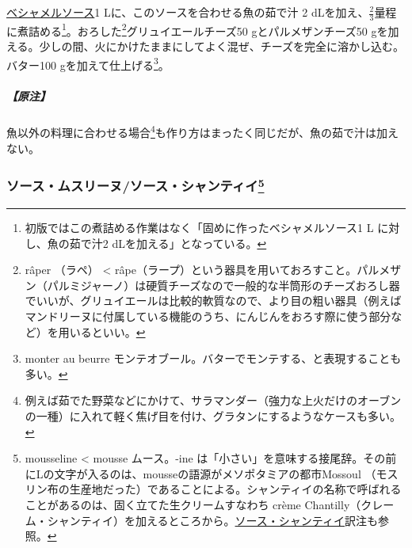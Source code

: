 \begin{recette}
\protect\hyperlink{sauce-bechamel}{ベシャメルソース}1
Lに、このソースを合わせる魚の茹で汁 2
dLを加え、\(\frac{2}{3}\)量程に煮詰める\footnote{初版ではこの煮詰める作業はなく「固めに作ったベシャメルソース1
  L に対し、魚の茹で汁2 dLを加える」となっている。}。おろした\footnote{râper
  （ラペ） \textless{}
  râpe（ラープ）という器具を用いておろすこと。パルメザン（パルミジャーノ）は硬質チーズなので一般的な半筒形のチーズおろし器でいいが、グリュイエールは比較的軟質なので、より目の粗い器具（例えばマンドリーヌに付属している機能のうち、にんじんをおろす際に使う部分など）を用いるといい。}グリュイエールチーズ50
gとパルメザンチーズ50
gを加える。少しの間、火にかけたままにしてよく混ぜ、チーズを完全に溶かし込む。バター100
gを加えて仕上げる\footnote{monter au beurre
  モンテオブール。バターでモンテする、と表現することも多い。}。

\hypertarget{nota-sauce-mornay}{%
\subparagraph{【原注】}\label{nota-sauce-mornay}}

魚以外の料理に合わせる場合\footnote{例えば茹でた野菜などにかけて、サラマンダー（強力な上火だけのオーブンの一種）に入れて軽く焦げ目を付け、グラタンにするようなケースも多い。}も作り方はまったく同じだが、魚の茹で汁は加えない。

\hypertarget{sauce-mousseline}{%
\subsubsection[ソース・ムスリーヌ/ソース・シャンティイ]{\texorpdfstring{ソース・ムスリーヌ/ソース・シャンティイ\footnote{mousseline
  \textless{} mousse ムース。-ine
  は「小さい」を意味する接尾辞。その前にLの文字が入るのは、mousseの語源がメソポタミアの都市Mossoul
  （モスリン布の生産地だった）であることによる。シャンティイの名称で呼ばれることがあるのは、固く立てた生クリームすなわち
  crème
  Chantilly（クレーム・シャンティイ）を加えるところから。\protect\hyperlink{sauce-chantilly}{ソース・シャンティイ}訳注も参照。}}{ソース・ムスリーヌ/ソース・シャンティイ}}\label{sauce-mousseline}}




\end{recette}
